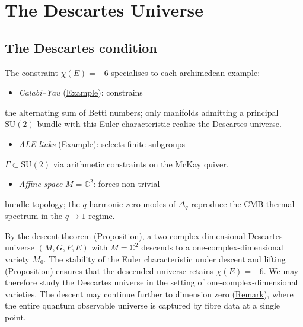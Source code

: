 \chapter{The Descartes Universe}
\label{chap:descartes}

\section{The Descartes condition}
\label{sec:descartes-condition}

\begin{remark}
  \label{rem:descartes-calabi-yau}
The constraint $\chi(E) = -6$ specialises to each archimedean example:

\begin{itemize}
  \item \emph{Calabi--Yau} (\hyperref[ex:calabi-yau]{Example}): constrains
\end{itemize}
  the alternating sum of Betti numbers; only manifolds admitting
  a principal $\mathrm{SU}(2)$-bundle with this Euler characteristic
  realise the Descartes universe.
\begin{itemize}
  \item \emph{ALE links} (\hyperref[ex:ale]{Example}): selects finite subgroups
\end{itemize}
  $\Gamma \subset \mathrm{SU}(2)$ via arithmetic constraints on
  the McKay quiver.
\begin{itemize}
  \item \emph{Affine space} $M = \mathbb{C}^2$: forces non-trivial
\end{itemize}
  bundle topology; the $q$-harmonic zero-modes of $\Delta_q$
  reproduce the CMB thermal spectrum in the $q \to 1$ regime.
\end{remark}

\begin{remark}
  \label{rem:descent-one-dim}
By the descent theorem (\hyperref[prop:jet-prolongation]{Proposition}), a
two-complex-dimensional Descartes universe $(M, G, P, E)$ with $M = \mathbb{C}^2$
descends to a one-complex-dimensional variety $M_0$.  The stability of the
Euler characteristic under descent and lifting
(\hyperref[prop:euler-char-stability]{Proposition}) ensures that the descended
universe retains $\chi(E) = -6$.  We may therefore study the Descartes
universe in the setting of one-complex-dimensional varieties.
The descent may continue further to dimension zero
(\hyperref[rem:descent-reduction-zero]{Remark}), where the entire quantum
observable universe is captured by fibre data at a single point.
\end{remark}

